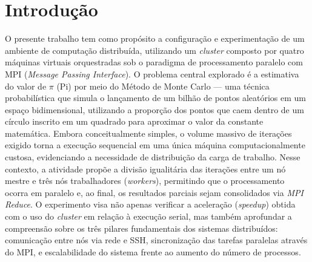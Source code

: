 \documentclass[
	12pt,
	oneside,
	a4paper,
	chapter=TITLE,
	section=TITLE,
	english,
	brazil,
	sumario=tradicional
]{abntex2}
\begin{document}
	\imprimirfolhaderosto
	
	
	\tableofcontents
	\newpage
		
		
		
		

\textual
   
\section{Introdução}

O presente trabalho tem como propósito a configuração e experimentação de um ambiente de computação distribuída, utilizando um \textit{cluster} composto por quatro máquinas virtuais orquestradas sob o paradigma de processamento paralelo com MPI (\textit{Message Passing Interface}). O problema central explorado é a estimativa do valor de $\pi$ (Pi) por meio do Método de Monte Carlo — uma técnica probabilística que simula o lançamento de um bilhão de pontos aleatórios em um espaço bidimensional, utilizando a proporção dos pontos que caem dentro de um círculo inscrito em um quadrado para aproximar o valor da constante matemática. Embora conceitualmente simples, o volume massivo de iterações exigido torna a execução sequencial em uma única máquina computacionalmente custosa, evidenciando a necessidade de distribuição da carga de trabalho. Nesse contexto, a atividade propõe a divisão igualitária das iterações entre um nó mestre e três nós trabalhadores (\textit{workers}), permitindo que o processamento ocorra em paralelo e, ao final, os resultados parciais sejam consolidados via \textit{MPI Reduce}. O experimento visa não apenas verificar a aceleração (\textit{speedup}) obtida com o uso do \textit{cluster} em relação à execução serial, mas também aprofundar a compreensão sobre os três pilares fundamentais dos sistemas distribuídos: comunicação entre nós via rede e SSH, sincronização das tarefas paralelas através do MPI, e escalabilidade do sistema frente ao aumento do número de processos.
\end{document}
